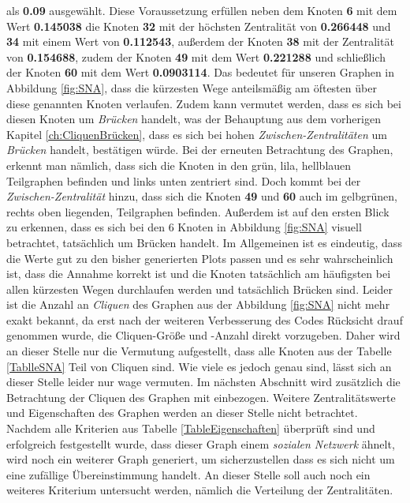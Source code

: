als \textbf{0.09} ausgewählt. Diese Voraussetzung erfüllen neben dem Knoten \textbf{6} mit dem Wert \textbf{0.145038} die Knoten \textbf{32} mit der höchsten Zentralität von \textbf{0.266448} und \textbf{34} mit einem Wert von \textbf{0.112543}, außerdem der Knoten \textbf{38} mit der Zentralität von \textbf{0.154688}, zudem der Knoten \textbf{49} mit dem Wert \textbf{0.221288} und schließlich der Knoten \textbf{60} mit dem Wert \textbf{0.0903114}. Das bedeutet für unseren Graphen in Abbildung \ref{fig:SNA}, dass die kürzesten Wege anteilsmäßig am öftesten über diese genannten Knoten verlaufen. Zudem kann vermutet werden, dass es sich bei diesen Knoten um \textit{Brücken} handelt, was der Behauptung aus dem vorherigen Kapitel \ref{ch:CliquenBrücken}, dass es sich bei hohen \textit{Zwischen-Zentralitäten} um \textit{Brücken} handelt, bestätigen würde. Bei der erneuten Betrachtung des Graphen, erkennt man nämlich, dass sich die Knoten in den grün, lila, hellblauen Teilgraphen befinden und links unten zentriert sind. Doch kommt bei der \textit{Zwischen-Zentralität} hinzu, dass sich die Knoten \textbf{49} und \textbf{60} auch im gelbgrünen, rechts oben liegenden, Teilgraphen befinden. Außerdem ist auf den ersten Blick zu erkennen, dass es sich bei den 6 Knoten in Abbildung \ref{fig:SNA} visuell betrachtet, tatsächlich um Brücken handelt. Im Allgemeinen ist es eindeutig, dass die Werte gut zu den bisher generierten Plots passen und es sehr wahrscheinlich ist, dass die Annahme korrekt ist und die Knoten tatsächlich am häufigsten bei allen kürzesten Wegen durchlaufen werden und tatsächlich Brücken sind. Leider ist die Anzahl an \textit{Cliquen} des Graphen aus der Abbildung \ref{fig:SNA} nicht mehr exakt bekannt, da erst nach der weiteren Verbesserung des Codes Rücksicht drauf genommen wurde, die Cliquen-Größe und -Anzahl direkt vorzugeben. Daher wird an dieser Stelle nur die Vermutung aufgestellt, dass alle Knoten aus der Tabelle \ref{TablleSNA} Teil von Cliquen sind. Wie viele es jedoch genau sind, lässt sich an dieser Stelle leider nur wage vermuten. Im nächsten Abschnitt wird zusätzlich die Betrachtung der Cliquen des Graphen mit einbezogen. Weitere Zentralitätswerte und Eigenschaften des Graphen werden an dieser Stelle nicht betrachtet. Nachdem alle Kriterien aus Tabelle \ref{TableEigenschaften} überprüft sind und erfolgreich festgestellt wurde, dass dieser Graph einem \textit{sozialen Netzwerk} ähnelt, wird noch ein weiterer Graph generiert, um sicherzustellen dass es sich nicht um eine zufällige Übereinstimmung handelt. An dieser Stelle soll auch noch ein weiteres Kriterium untersucht werden, nämlich die Verteilung der Zentralitäten.


